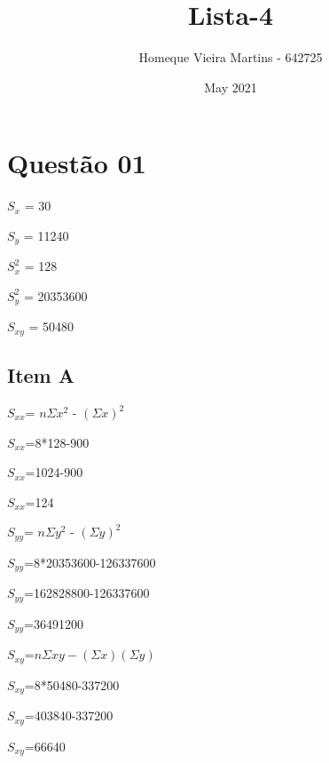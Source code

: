 \documentclass{article}
\title{Lista-4}
\author{Homeque Vieira Martins - 642725}
\date{May 2021}
\begin{document}
\maketitle
\section{Questão 01}

    \begin{flushleft}
    
    $S_x$ = 30
    
    $S_y$ = 11240
    
    $S_x^2$ = 128
    
    $S_y^2$ = 20353600
    
    $S_{xy}$ = 50480

    \end{flushleft}
    
        \subsection{Item A}

            \begin{flushleft}

            $S_{xx}$= $n\Sigma x^2$ - $(\Sigma x)^2$ 
            
            $S_{xx}$=8*128-900

            $S_{xx}$=1024-900
            
            $S_{xx}$=124

            \end{flushleft}
        
            \begin{flushleft}
                $S_{yy}$= $n\Sigma y^2$ - $(\Sigma y)^2$

                $S_{yy}$=8*20353600-126337600

                $S_{yy}$=162828800-126337600

                $S_{yy}$=36491200

            \end{flushleft}

            \begin{flushleft}

               $S_{xy}$=$n\Sigma xy-(\Sigma x)(\Sigma y)$
               
               $S_{xy}$=8*50480-337200
               
               $S_{xy}$=403840-337200 
               
               $S_{xy}$=66640 
    
            \end{flushleft}
\end{document}
